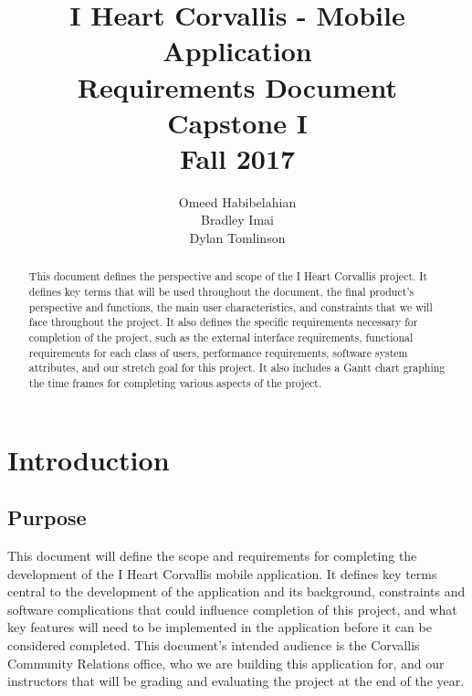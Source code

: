 \documentclass[draftclsnofoot, onecolumn, 10pt, compsoc]{IEEEtran}
\title{\textbf{I Heart Corvallis - Mobile Application\\Requirements Document}\\Capstone I\\Fall 2017}
\author{Omeed Habibelahian\\Bradley Imai\\Dylan Tomlinson}
\begin{document}
	\maketitle
	\begin{abstract}
		This document defines the perspective and scope of the I Heart Corvallis project. It defines key terms that will be used throughout the document, the final product's perspective and functions, the main user characteristics, and constraints that we will face throughout the project. It also defines the specific requirements necessary for completion of the project, such as the external interface requirements, functional requirements for each class of users, performance requirements, software system attributes, and our stretch goal for this project. It also includes a Gantt chart graphing the time frames for completing various aspects of the project.
	\end{abstract}
	\newpage
	
	\section{Introduction}
		\subsection{Purpose}
			This document will define the scope and requirements for completing the development of the I Heart Corvallis mobile application. It defines key terms central to the development of the application and its background, constraints and software complications that could influence completion of this project, and what key features will need to be implemented in the application before it can be considered completed. This document's intended audience is the Corvallis Community Relations office, who we are building this application for, and our instructors that will be grading and evaluating the project at the end of the year.
			
\end{document}
